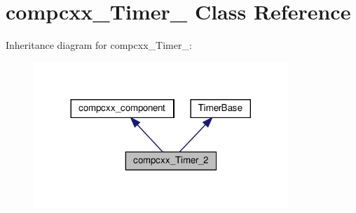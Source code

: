 \hypertarget{classcompcxx__Timer__2}{}\section{compcxx\+\_\+\+Timer\+\_ Class Reference}
\label{classcompcxx__Timer__2}


Inheritance diagram for compcxx\+\_\+\+Timer\+\_\+:\nopagebreak
\begin{figure}[H]
\begin{center}
\leavevmode
\includegraphics[width=272pt]{classcompcxx__Timer__2__inherit__graph}
\end{center}
\end{figure}


